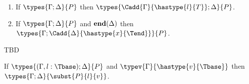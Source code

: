 \begin{lemma}[Weakening]\mbox{}
  \begin{enumerate}
  \item If \( \types{\Gamma; \Delta}{P} \) then
    \( \types{\Cadd{\Gamma}{\hastype{l}{T}};\Delta}{P} \).
      \item If \( \types{\Gamma; \Delta}{P} \) and \( \mathbf{end}(\Delta) \) then
    \( \types{\Gamma;\Cadd{\Delta}{\hastype{x}{\Tend}}}{P} \).
\end{enumerate}
\end{lemma}

\begin{lemma}[Strengthening]\mbox{}
  TBD
\end{lemma}

\begin{lemma}[Substitution]\mbox{}
  If $\types{(\Gamma, l : \Tbase);\Delta}{P}$ and ${\typev{\Gamma}{\hastype{v}{\Tbase}}}$ then
  \( \types{\Gamma;\Delta}{\subst{P}{l}{v}} \).
\end{lemma}



